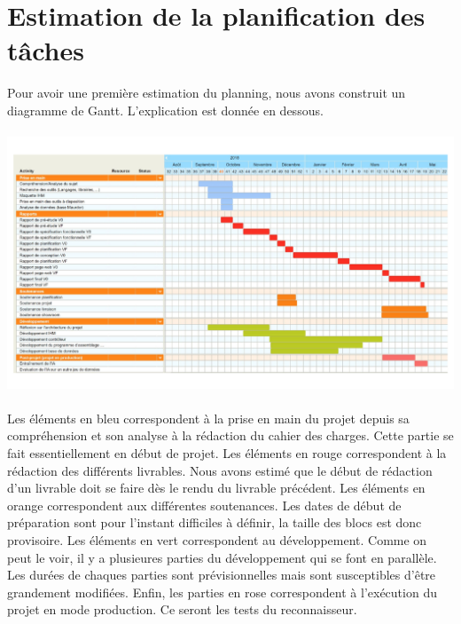 \section{Estimation de la planification des tâches}

Pour avoir une première estimation du planning, nous avons construit un diagramme de Gantt. L’explication est donnée en dessous.

\paragraph{}
\begin{mdframed}[frametitle={Estimation de la planification des tâches}, innerbottommargin=10]
\begin{center}
\includegraphics[width=\linewidth]{gantt.pdf}
\end{center}
\end{mdframed}

\paragraph{}
Les éléments en bleu correspondent à la prise en main du projet depuis sa compréhension et son analyse
à la rédaction du cahier des charges. Cette partie se fait essentiellement en début de projet. Les éléments en rouge
correspondent à la rédaction des différents livrables. Nous avons estimé que le début de rédaction d’un livrable
doit se faire dès le rendu du livrable précédent. Les éléments en orange correspondent aux différentes soutenances.
Les dates de début de préparation sont pour l’instant difficiles à définir, la taille des blocs est donc provisoire.
Les éléments en vert correspondent au développement. Comme on peut le voir, il y a plusieures parties du développement
qui se font en parallèle. Les durées de chaques parties sont prévisionnelles mais sont susceptibles d’être grandement modifiées.
Enfin, les parties en rose correspondent à l'exécution du projet en mode production. Ce seront les tests du reconnaisseur.